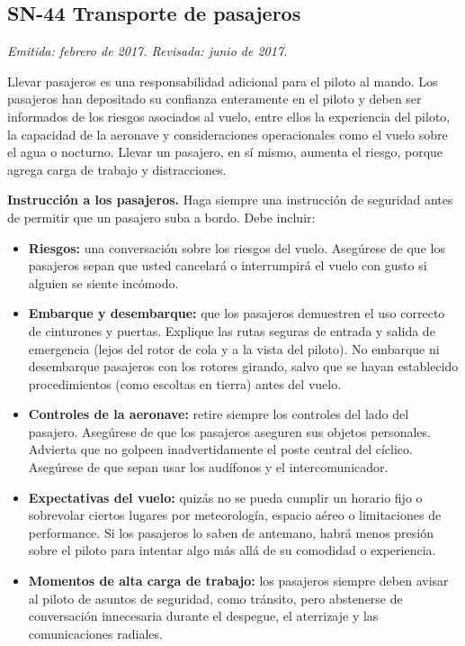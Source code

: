 \subsection*{SN-44 \quad Transporte de pasajeros}
{\small\textit{Emitida: febrero de 2017. Revisada: junio de 2017.}}

Llevar pasajeros es una responsabilidad adicional para el piloto al mando. Los pasajeros han depositado su confianza enteramente en el piloto y deben ser informados de los riesgos asociados al vuelo, entre ellos la experiencia del piloto, la capacidad de la aeronave y consideraciones operacionales como el vuelo sobre el agua o nocturno. Llevar un pasajero, en sí mismo, aumenta el riesgo, porque agrega carga de trabajo y distracciones.

\textbf{Instrucción a los pasajeros.} Haga siempre una instrucción de seguridad antes de permitir que un pasajero suba a bordo. Debe incluir:

\begin{itemize}
\item \textbf{Riesgos:} una conversación sobre los riesgos del vuelo. Asegúrese de que los pasajeros sepan que usted cancelará o interrumpirá el vuelo con gusto si alguien se siente incómodo.
\item \textbf{Embarque y desembarque:} que los pasajeros demuestren el uso correcto de cinturones y puertas. Explique las rutas seguras de entrada y salida de emergencia (lejos del rotor de cola y a la vista del piloto). No embarque ni desembarque pasajeros con los rotores girando, salvo que se hayan establecido procedimientos (como escoltas en tierra) antes del vuelo.
\item \textbf{Controles de la aeronave:} retire siempre los controles del lado del pasajero. Asegúrese de que los pasajeros aseguren sus objetos personales. Advierta que no golpeen inadvertidamente el poste central del cíclico. Asegúrese de que sepan usar los audífonos y el intercomunicador.
\item \textbf{Expectativas del vuelo:} quizás no se pueda cumplir un horario fijo o sobrevolar ciertos lugares por meteorología, espacio aéreo o limitaciones de performance. Si los pasajeros lo saben de antemano, habrá menos presión sobre el piloto para intentar algo más allá de su comodidad o experiencia.
\item \textbf{Momentos de alta carga de trabajo:} los pasajeros siempre deben avisar al piloto de asuntos de seguridad, como tránsito, pero abstenerse de conversación innecesaria durante el despegue, el aterrizaje y las comunicaciones radiales.
\end{itemize}

